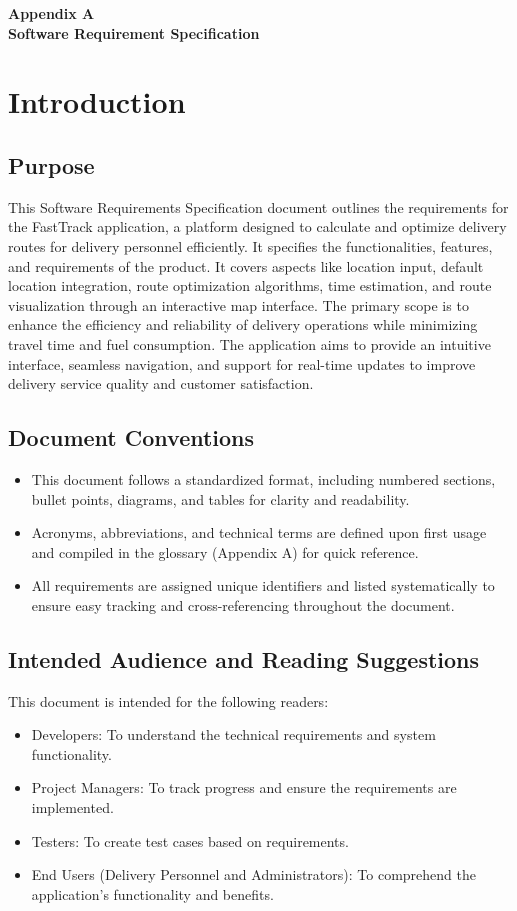 \appendix
\renewcommand{\thesection}{A.\arabic{section}}
\begin{center}
    \Huge \textbf{Appendix A} \\[5pt]
    \Huge \textbf{Software Requirement Specification}
\end{center}
\section{Introduction}
\subsection{Purpose}
This Software Requirements Specification document outlines the requirements for the FastTrack application, a platform designed to calculate and optimize delivery routes for delivery personnel efficiently. It specifies the functionalities, features, and requirements of the product. It covers aspects like location input, default location integration, route optimization algorithms, time estimation, and route visualization through an interactive map interface.  
The primary scope is to enhance the efficiency and reliability of delivery operations while minimizing travel time and fuel consumption. The application aims to provide an intuitive interface, seamless navigation, and support for real-time updates to improve delivery service quality and customer satisfaction.
\subsection{Document Conventions}

\begin{itemize}
    \item This document follows a standardized format, including numbered sections, bullet points, diagrams, and tables for clarity and readability.
    \item Acronyms, abbreviations, and technical terms are defined upon first usage and compiled in the glossary (Appendix A) for quick reference.
    \item All requirements are assigned unique identifiers and listed systematically to ensure easy tracking and cross-referencing throughout the document. 
\end{itemize}

\subsection{Intended Audience and Reading Suggestions}
This document is intended for the following readers:
\begin{itemize}
    \item Developers: To understand the technical requirements and system functionality.
    \item Project Managers: To track progress and ensure the requirements are implemented.
    \item Testers: To create test cases based on requirements.
    \item End Users (Delivery Personnel and Administrators): To comprehend the application's functionality and benefits.
\end{itemize}


